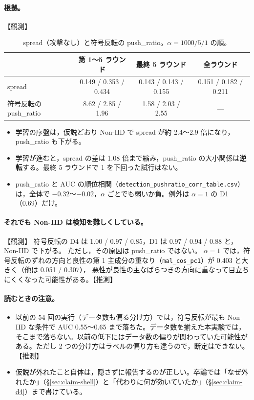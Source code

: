 \documentclass[a4j, dvipdfmx]{jsarticle}  %
\begin{document}
\paragraph{根拠。}【観測】
\begin{table}[H]
\centering
\caption{spread（攻撃なし）と符号反転の push\_ratio。$\alpha = 1000 / 5 / 1$ の順。}
\begin{tabular}{@{}lccc@{}}
\toprule
 & 第 1〜5 ラウンド & 最終 5 ラウンド & 全ラウンド \\
\midrule
spread & 0.149 / 0.353 / 0.434 & 0.143 / 0.143 / 0.155 & 0.151 / 0.182 / 0.211 \\
符号反転の push\_ratio & 8.62 / 2.85 / 1.96 & 1.58 / 2.03 / 2.55 & --- \\
\bottomrule
\end{tabular}
\end{table}
\begin{itemize}
  \item 学習の序盤は，仮説どおり Non-IID で spread が約 2.4〜2.9 倍になり，push\_ratio も下がる。
  \item 学習が進むと，spread の差は 1.08 倍まで縮み，push\_ratio の大小関係は\textbf{逆転}する。最終 5 ラウンドで 1 を下回った試行はない。
  \item push\_ratio と AUC の順位相関（\texttt{detection\_pushratio\_corr\_table.csv}）は，全体で $-0.32$〜$-0.02$，$\alpha$ ごとでも弱いか負。例外は $\alpha = 1$ の D1（0.69）だけ。
\end{itemize}

\paragraph{それでも Non-IID は検知を難しくしている。}【観測】
符号反転の D4 は 1.00 / 0.97 / 0.85，D1 は 0.97 / 0.94 / 0.88 と，Non-IID で下がる。
ただし，その原因は push\_ratio ではない。
$\alpha = 1$ では，符号反転のずれの方向と良性の第 1 主成分の重なり（\texttt{mal\_cos\_pc1}）が 0.403 と大きく（他は 0.051 / 0.307），
悪性が良性の主なばらつきの方向に重なって目立ちにくくなった可能性がある。【推測】

\paragraph{読むときの注意。}
\begin{itemize}
  \item 以前の 54 回の実行（データ数も偏る分け方）では，符号反転が最も Non-IID な条件で AUC 0.55〜0.65 まで落ちた。データ数を揃えた本実験では，そこまで落ちない。以前の低下にはデータ数の偏りが関わっていた可能性がある。ただし 2 つの分け方はラベルの偏り方も違うので，断定はできない。【推測】
  \item 仮説が外れたこと自体は，隠さずに報告するのが正しい。卒論では「なぜ外れたか」（\S\ref{sec:claim-shell}）と「代わりに何が効いていたか」（\S\ref{sec:claim-d4}）まで書けている。
\end{itemize}
\end{document}
